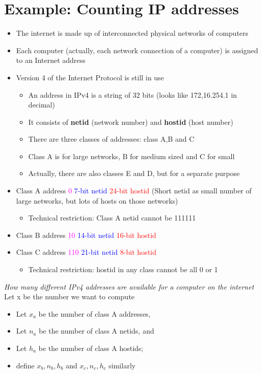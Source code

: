 \documentclass{article}[18pt]
\begin{document}
\section{Example: Counting IP addresses}
\begin{itemize}
\item The internet is made up of interconnected physical networks of computers
\item Each computer (actually, each network connection of a computer) is assigned to an Internet address
\item Version 4 of the Internet Protocol is still in use

\begin{itemize}
\item An address in IPv4 is a string of 32 bits (looks like 172,16.254.1 in decimal)
\item It consists of \textbf{netid} (network number) and \textbf{hostid} (host number)
\item There are three classes of addresses: class A,B and C
\item Class A is for large networks, B for medium sized and C for small
\item Actually, there are also classes E and D, but for a separate purpose 
\end{itemize}
\item Class A address \textcolor{magenta}{0} \textcolor{blue}{7-bit netid } \textcolor{red}{24-bit hostid} (Short netid as small number of large networks, but lots of hosts on those networks)
\begin{itemize}
\item Technical restriction: Class A netid cannot be 111111
\end{itemize}
\item Class B address \textcolor{magenta}{10} \textcolor{blue}{14-bit netid }\textcolor{red}{16-bit hostid} 
\item Class C address \textcolor{magenta}{110} \textcolor{blue}{21-bit netid }\textcolor{red}{8-bit hostid} 
\begin{itemize}
\item Technical restriction: hostid in any class cannot be all 0 or 1
\end{itemize}
\end{itemize}
\newpage
\textit{How many different IPv4 addresses are available for a computer on the internet}\\
Let x be the number we want to compute
\begin{itemize}
\item Let $x_a$ be the number of class A addresses,
\item Let $n_a$ be the number of class A netids, and
\item Let $h_a$ be the number of class A hostids;
\item define $x_b, n_b, h_b$ and $x_c,n_c,h_c$ similarly
\end{itemize}
\end{document}
